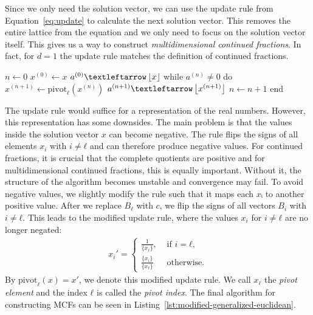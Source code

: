 Since we only need the solution vector,
we can use the update rule from Equation~\ref{eq:update}
to calculate the next solution vector.
This removes the entire lattice from the equation
and we only need to focus on the solution vector itself.
This gives us a way to construct \emph{multidimensional continued fractions}.
In fact, for $d = 1$ the update rule matches the definition of continued fractions.


\begin{Pseudocode}[
    float=tbp,
    label={lst:modified-generalized-euclidean},
    caption={
      The algorithm for constructing a multidimensional continued fraction
      based on the generalized Euclidean algorithm.
      It constructs a representation for a vector $x ∈ ℝ^d$
      as a list ${[a^{(0)}; a^{(1)}, …]}$ with $a^{(n)} ∈ ℤ^d$
      using the pivot operation from Equation~\ref{eq:modified-update-rule}.
    }]
$n ← 0$
$x^{(0)} ← x$
$a^{(0)} ← \floor{x}$
while $a^{(n)} ≠ 0$ do
  $x^{(n+1)} ← \mathrm{pivot}_ℓ(x^{(n)})$
  $a^{(n+1)} ← \floor{x^{(n+1)}}$
  $n ← n + 1$
end
\end{Pseudocode}

The update rule would suffice for a representation of the real numbers.
However, this representation has some downsides.
The main problem is that the values inside the solution vector $x$ can become negative.
The rule flips the signs of all elements $x_i$ with $i ≠ ℓ$
and can therefore produce negative values.
For continued fractions, it is crucial that the complete quotients are positive \cite{Northshield11}
and for multidimensional continued fractions, this is equally important.
Without it, the structure of the algorithm becomes unstable and convergence may fail.
To avoid negative values, we slightly modify the rule such that it maps each $xᵢ$ to another positive value.
After we replace $B_ℓ$ with $c$, we flip the signs of all vectors $B_i$ with $i ≠ ℓ$.
This leads to the modified update rule, where the values $x_i$ for $i ≠ ℓ$ are
no longer negated:
\begin{align}
  \label{eq:modified-update-rule}
  x_i' =
  \begin{cases}
    \frac{1}{\{x_ℓ\}},  & \text{ if } i = ℓ, \\
    \frac{\{x_i\}}{\{x_ℓ\}} & \text{ otherwise.}
  \end{cases}
\end{align}
By $\mathrm{pivot}_ℓ(x) = x'$, we denote this modified update rule.
We call $x_ℓ$ the \emph{pivot element} and the index $ℓ$ is called the \emph{pivot index}.
The final algorithm for constructing MCFs can be seen in
Listing~\ref{lst:modified-generalized-euclidean}.

